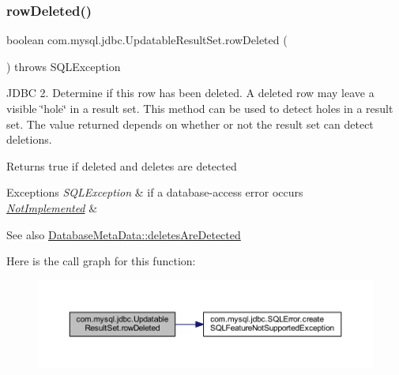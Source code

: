 \subsubsection{\texorpdfstring{row\+Deleted()}{rowDeleted()}}
{\footnotesize\ttfamily boolean com.\+mysql.\+jdbc.\+Updatable\+Result\+Set.\+row\+Deleted (\begin{DoxyParamCaption}{ }\end{DoxyParamCaption}) throws S\+Q\+L\+Exception}

J\+D\+BC 2. Determine if this row has been deleted. A deleted row may leave a visible \char`\"{}hole\char`\"{} in a result set. This method can be used to detect holes in a result set. The value returned depends on whether or not the result set can detect deletions.

\begin{DoxyReturn}{Returns}
true if deleted and deletes are detected
\end{DoxyReturn}

\begin{DoxyExceptions}{Exceptions}
{\em S\+Q\+L\+Exception} & if a database-\/access error occurs \\
\hline
{\em \mbox{\hyperlink{classcom_1_1mysql_1_1jdbc_1_1_not_implemented}{Not\+Implemented}}} & \\
\hline
\end{DoxyExceptions}
\begin{DoxySeeAlso}{See also}
\mbox{\hyperlink{classcom_1_1mysql_1_1jdbc_1_1_database_meta_data_a2285b39a35023c91168afdebbfd4e935}{Database\+Meta\+Data\+::deletes\+Are\+Detected}} 
\end{DoxySeeAlso}
Here is the call graph for this function\+:
\nopagebreak
\begin{figure}[H]
\begin{center}
\leavevmode
\includegraphics[width=350pt]{classcom_1_1mysql_1_1jdbc_1_1_updatable_result_set_a64824468904a1fc69bc116d10d4a274f_cgraph}
\end{center}
\end{figure}
\mbox{\label{classcom_1_1mysql_1_1jdbc_1_1_updatable_result_set_a50cd8500080d2403e86b968b0cd9718b}} 
